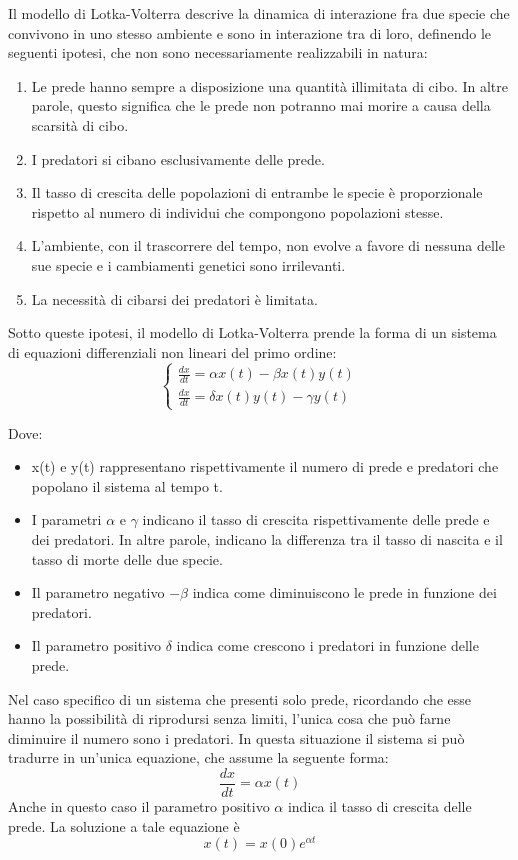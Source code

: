 \documentclass[11pt]{article}
\begin{document}
Il modello di Lotka-Volterra\cite{Artioli} descrive la dinamica di interazione fra due specie che convivono in uno stesso ambiente e sono in interazione tra di loro, definendo le seguenti ipotesi, che non sono necessariamente realizzabili in natura: 
\begin{enumerate}
    \item Le prede hanno sempre a disposizione una quantità illimitata di cibo. In altre parole, questo significa che le prede non potranno mai morire a causa della scarsità di cibo. 
    \item I predatori si cibano esclusivamente delle prede. 
    \item Il tasso di crescita delle popolazioni di entrambe le specie è proporzionale rispetto al numero di individui che compongono popolazioni stesse.
    \item L'ambiente, con il trascorrere del tempo, non evolve a favore di nessuna delle sue specie e i cambiamenti genetici sono irrilevanti. 
    \item La necessità di cibarsi dei predatori è limitata. 
\end{enumerate}

Sotto queste ipotesi, il modello di Lotka-Volterra prende la forma di un sistema di equazioni differenziali non lineari del primo ordine:
\[
\label{eqn:modelloGenerale}
\left\{
\begin{array}{cc}
\frac{dx}{dt}=\alpha x(t) - \beta x(t)y(t)\\
\frac{dx}{dt}=\delta x(t)y(t) - \gamma y(t)
\end{array}
\right.
\]

Dove: 
\begin{itemize}
    \item x(t) e y(t) rappresentano rispettivamente il numero di prede e predatori che popolano il sistema al tempo t.
    \item I parametri $\alpha$ e $\gamma$ indicano il tasso di crescita rispettivamente delle prede e dei predatori. In altre parole, indicano la differenza tra il tasso di nascita e il tasso di morte delle due specie.
    \item Il parametro negativo $-\beta$ indica come diminuiscono le prede in funzione dei predatori.
    \item Il parametro positivo $\delta$ indica come crescono i predatori in funzione delle prede. 
\end{itemize}

\noindent Nel caso specifico di un sistema che presenti solo prede, ricordando che esse hanno la possibilità di riprodursi senza limiti, l'unica cosa che può farne diminuire il numero sono i predatori.  
In questa situazione il sistema si può tradurre in un'unica equazione, che assume la seguente forma: 
\[
    \frac{dx}{dt} = \alpha x(t) 
\]
Anche in questo caso il parametro positivo $\alpha$ indica il tasso di crescita delle prede. 
La soluzione a tale equazione è 
\begin{equation}\label{eqn:soloPrede}
    x(t) = x(0)e^{\alpha t}
\end{equation}
\end{document}
